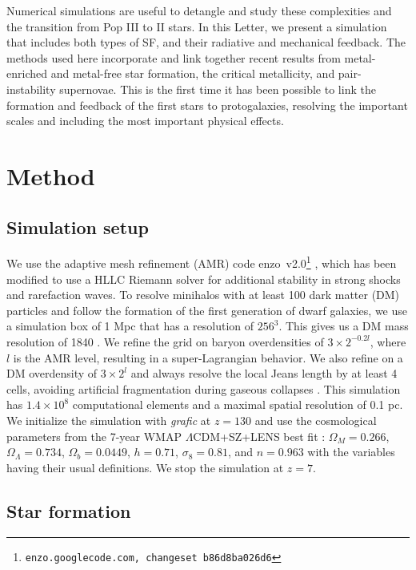 \documentclass[12pt,preprint]{aastex}
\begin{document}
Numerical simulations are useful to detangle and study these
complexities and the transition from Pop III to II stars.  In this
Letter, we present a simulation that includes both types of SF, and
their radiative and mechanical feedback.  The methods used here
incorporate and link together recent results from metal-enriched and
metal-free star formation, the critical metallicity, and
pair-instability supernovae.  This is the first time it has been
possible to link the formation and feedback of the first stars to
protogalaxies, resolving the important scales and including the most
important physical effects.

\section{Method}
\label{sec:setup}

\subsection{Simulation setup}

We use the adaptive mesh refinement (AMR) code
enzo~v2.0\footnote{\texttt{enzo.googlecode.com, changeset
    b86d8ba026d6}} \citep{OShea2004}, which has been modified to use a
HLLC Riemann solver \citep{Toro94_HLLC} for additional stability in
strong shocks and rarefaction waves.  To resolve minihalos with at
least 100 dark matter (DM) particles and follow the formation of the
first generation of dwarf galaxies, we use a simulation box of 1 Mpc
that has a resolution of $256^3$.  This gives us a DM mass resolution
of 1840 \Ms.  We refine the grid on baryon overdensities of $3 \times
2^{-0.2l}$, where $l$ is the AMR level, resulting in a
super-Lagrangian behavior.  We also refine on a DM overdensity of $3
\times 2^l$ and always resolve the local Jeans length by at least 4
cells, avoiding artificial fragmentation during gaseous collapses
\citep{Truelove97}.  This simulation has $1.4 \times 10^8$
computational elements and a maximal spatial resolution of 0.1 pc.  We
initialize the simulation with \textsl{grafic} \citep{Bertschinger01}
at $z = 130$ and use the cosmological parameters from the 7-year WMAP
$\Lambda$CDM+SZ+LENS best fit \citep{WMAP7}: $\Omega_M = 0.266$,
$\Omega_\Lambda = 0.734$, $\Omega_b = 0.0449$, $h = 0.71$, $\sigma_8 =
0.81$, and $n = 0.963$ with the variables having their usual
definitions.  We stop the simulation at $z=7$.

\subsection{Star formation}
\end{document}
